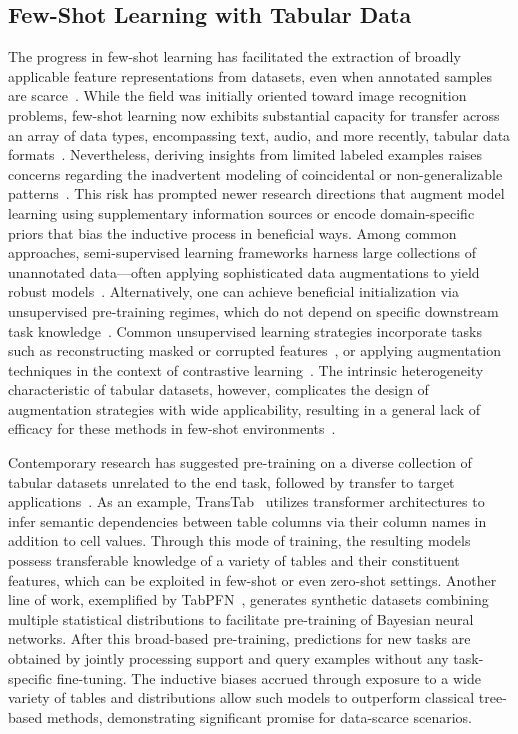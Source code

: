 \subsection{Few-Shot Learning with Tabular Data} The progress in few-shot learning has facilitated the extraction of broadly applicable feature representations from datasets, even when annotated samples are scarce~\cite{chen2018closer}. While the field was initially oriented toward image recognition problems, few-shot learning now exhibits substantial capacity for transfer across an array of data types, encompassing text, audio, and more recently, tabular data formats~\cite{majumder2022few,nam2023stunt,schick2021exploiting}. Nevertheless, deriving insights from limited labeled examples raises concerns regarding the inadvertent modeling of coincidental or non-generalizable patterns~\cite{bartlett2021deep}. This risk has prompted newer research directions that augment model learning using supplementary information sources or encode domain-specific priors that bias the inductive process in beneficial ways. Among common approaches, semi-supervised learning frameworks harness large collections of unannotated data—often applying sophisticated data augmentations to yield robust models~\cite{ucar2021subtab,yoon2020vime}. Alternatively, one can achieve beneficial initialization via unsupervised pre-training regimes, which do not depend on specific downstream task knowledge~\cite{somepalli2021saint}. Common unsupervised learning strategies incorporate tasks such as reconstructing masked or corrupted features~\cite{arik2021tabnet,majmundar2022met}, or applying augmentation techniques in the context of contrastive learning~\cite{bahri2022scarf,chen2020simple}. The intrinsic heterogeneity characteristic of tabular datasets, however, complicates the design of augmentation strategies with wide applicability, resulting in a general lack of efficacy for these methods in few-shot environments~\cite{nam2023stunt}.

Contemporary research has suggested pre-training on a diverse collection of tabular datasets unrelated to the end task, followed by transfer to target applications~\cite{zhang2023generative,levin2022transfer,zhu2023xtab}. As an example, TransTab~\cite{wang2022transtab} utilizes transformer architectures to infer semantic dependencies between table columns via their column names in addition to cell values. Through this mode of training, the resulting models possess transferable knowledge of a variety of tables and their constituent features, which can be exploited in few-shot or even zero-shot settings. Another line of work, exemplified by TabPFN~\cite{hollmann2022tabpfn}, generates synthetic datasets combining multiple statistical distributions to facilitate pre-training of Bayesian neural networks. After this broad-based pre-training, predictions for new tasks are obtained by jointly processing support and query examples without any task-specific fine-tuning. The inductive biases accrued through exposure to a wide variety of tables and distributions allow such models to outperform classical tree-based methods, demonstrating significant promise for data-scarce scenarios.

